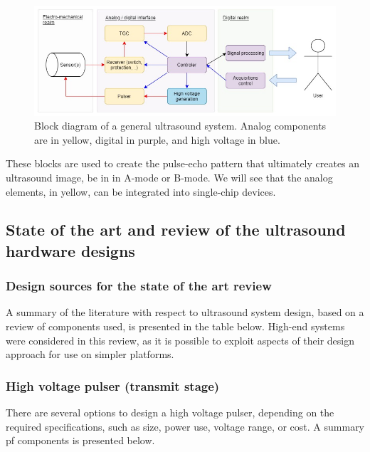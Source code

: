 \documentclass{article}
\begin{document}
\begin{figure}[H]
 \includegraphics[width=\linewidth]{Fig1.jpg}
 \caption{Block diagram of a general ultrasound system. Analog components are in yellow, digital in purple, and high voltage in blue.}
 \label{fig:BlockDiagramme}
\end{figure}

These blocks are used to create the pulse-echo pattern that ultimately creates an ultrasound image, be in in A-mode or B-mode. We will see that the analog elements, in yellow, can be integrated into single-chip devices.




\subsection{State of the art and review of the ultrasound hardware designs}

\subsubsection{Design sources for the state of the art review}

A summary of the literature with respect to ultrasound system design, based on a review of components used, is presented in the table below. High-end systems were considered in this review, as it is possible to exploit aspects of their design approach for use on simpler platforms. 



\subsubsection{High voltage pulser (transmit stage)}

There are several options to design a high voltage pulser, depending on the required specifications, such as size, power use, voltage range, or cost. A summary pf components is presented below.


\end{document}
